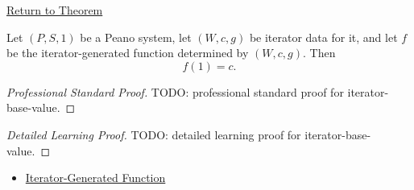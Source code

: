\newpage
{}
\label{prf:iterator-base-value}

\begin{remark*}[Return]
\hyperref[thm:iterator-base-value]{Return to Theorem}
\end{remark*}

\begin{theorem*}
Let $(P,S,1)$ be a Peano system, let $(W,c,g)$ be iterator data for it, and let
$f$ be the iterator-generated function determined by $(W,c,g)$. Then
\[
f(1)=c.
\]
\end{theorem*}

\begin{proof}[Professional Standard Proof]
\LRAProofBodyStart
TODO: professional standard proof for iterator-base-value.
\end{proof}

\begin{proof}[Detailed Learning Proof]
\LRAProofBodyStart
TODO: detailed learning proof for iterator-base-value.
\end{proof}

\begin{remark*}
\end{remark*}

\begin{dependencies}
\begin{itemize}
  \item \hyperref[def:iterator-generated-function]{Iterator-Generated Function}
\end{itemize}
\end{dependencies}

\clearpage

